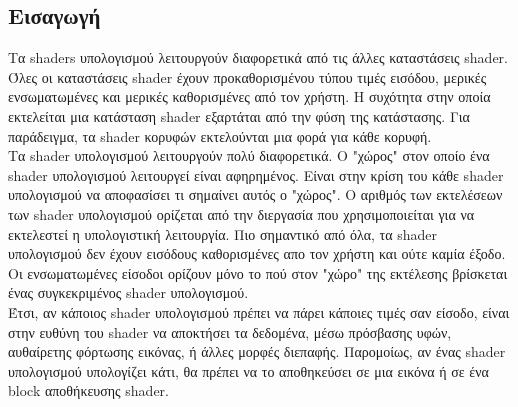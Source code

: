 \subsection{Εισαγωγή}
Τα shaders υπολογισμού λειτουργούν διαφορετικά από τις άλλες καταστάσεις shader. Όλες οι καταστάσεις shader έχουν προκαθορισμένου τύπου τιμές εισόδου, μερικές ενσωματωμένες και μερικές καθορισμένες από τον χρήστη. Η συχότητα στην οποία εκτελείται μια κατάσταση shader εξαρτάται από την φύση της κατάστασης. Για παράδειγμα, τα shader κορυφών εκτελούνται μια φορά για κάθε κορυφή. \\
Τα shader υπολογισμού λειτουργούν πολύ διαφορετικά. Ο "χώρος" στον οποίο ένα shader υπολογισμού λειτουργεί είναι αφηρημένος. Είναι στην κρίση του κάθε shader υπολογισμού να αποφασίσει τι σημαίνει αυτός ο "χώρος". Ο αριθμός των εκτελέσεων των shader υπολογισμού ορίζεται από την διεργασία που χρησιμοποιείται για να εκτελεστεί η υπολογιστική λειτουργία. Πιο σημαντικό από όλα, τα shader υπολογισμού δεν έχουν εισόδους καθορισμένες απο τον χρήστη και ούτε καμία έξοδο. Οι ενσωματωμένες είσοδοι ορίζουν μόνο το πού στον "χώρο" της εκτέλεσης βρίσκεται ένας συγκεκριμένος shader υπολογισμού.\\
Έτσι, αν κάποιος shader υπολογισμού πρέπει να πάρει κάποιες τιμές σαν είσοδο, είναι στην ευθύνη του shader να αποκτήσει τα δεδομένα, μέσω πρόσβασης υφών, αυθαίρετης φόρτωσης εικόνας, ή άλλες μορφές διεπαφής. Παρομοίως, αν ένας shader υπολογισμού υπολογίζει κάτι, θα πρέπει να το αποθηκεύσει σε μια εικόνα ή σε ένα block αποθήκευσης shader.
